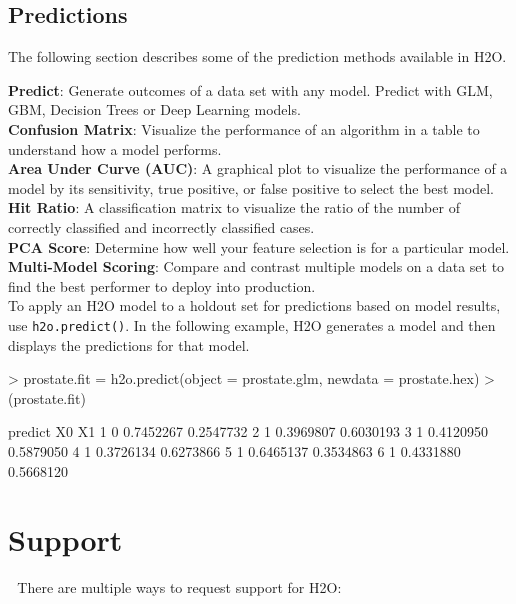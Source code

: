 \documentclass[11pt]{article}
\begin{document}
\subsection{Predictions}

The following section describes some of the prediction methods available in H2O. 

{\textbf{Predict}}: Generate outcomes of a data set with any model. Predict with GLM, GBM, Decision Trees or Deep Learning models.\\

{\textbf{Confusion Matrix}}: Visualize the performance of an algorithm in a table to understand how a model performs.\\

{\textbf{Area Under Curve (AUC)}}: A graphical plot to visualize the performance of a model by its sensitivity, true positive, or false positive to select the best model.\\

{\textbf{Hit Ratio}}: A classification matrix to visualize the ratio of the number of correctly classified and incorrectly classified cases.\\

{\textbf{PCA Score}}: Determine how well your feature selection is for a particular model.\\

{\textbf{Multi-Model Scoring}}: Compare and contrast multiple models on a data set to find the best performer to deploy into production.\\

To apply an H2O model to a holdout set for predictions based on model results, use {\texttt{h2o.predict()}}.  In the following example, H2O generates a model and then displays the predictions for that model. 
\begin{spverbatim}
> prostate.fit = h2o.predict(object = prostate.glm, newdata = prostate.hex)
> (prostate.fit)

predict        X0        X1
      1       0 0.7452267 0.2547732
      2       1 0.3969807 0.6030193
      3       1 0.4120950 0.5879050
      4       1 0.3726134 0.6273866
      5       1 0.6465137 0.3534863
      6       1 0.4331880 0.5668120
\end{spverbatim}


\section{Support} 
There are multiple ways to request support for H2O: \\
\end{document}
